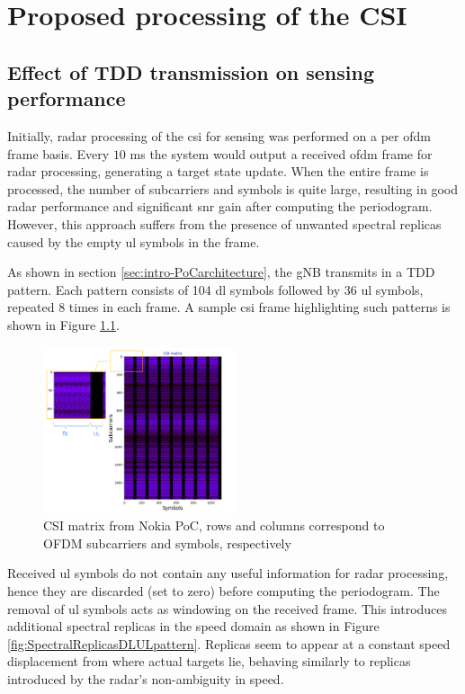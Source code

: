 \chapter{Proposed processing of the CSI}
\label{chap:TDD pattern of the OFDM frame}

\section{Effect of TDD transmission on sensing performance}

	Initially, radar processing  of the \gls{csi} for sensing was performed on a per \gls{ofdm} frame basis. Every $10$ ms the system would output a received \gls{ofdm} frame for radar processing, generating a target state update. When the entire frame is processed, the number of subcarriers and symbols is quite large, resulting in good radar performance and significant \gls{snr} gain after computing the periodogram. However, this approach suffers from the presence of unwanted spectral replicas caused by the empty \gls{ul} symbols in the frame.
	
	As shown in section \ref{sec:intro-PoCarchitecture}, the gNB transmits in a TDD pattern. Each pattern consists of 104 \gls{dl} symbols followed by 36 \gls{ul} symbols, repeated 8 times in each frame. A sample \gls{csi} frame highlighting such patterns is shown in Figure \ref{fig:CSIMatrix_DLULpattern}.
	
	\begin{figure}[H]
	    \centering
	    \includegraphics[width=0.5\textwidth]{Images/TDDprocessing/CSIMatrix_DLULpattern.png}
	    \caption{CSI matrix from Nokia PoC, rows and columns correspond to OFDM subcarriers and symbols, respectively}
	    \label{fig:CSIMatrix_DLULpattern}
	\end{figure}
	
	Received \gls{ul} symbols do not contain any useful information for radar processing, hence they are discarded (set to zero) before computing the periodogram.
    The removal of \gls{ul} symbols acts as windowing on the received frame. This introduces additional spectral replicas in the speed domain as shown in Figure \ref{fig:SpectralReplicasDLULpattern}. Replicas seem to appear at a constant speed displacement from where actual targets lie, behaving similarly to replicas introduced by the radar's non-ambiguity in speed.
    
